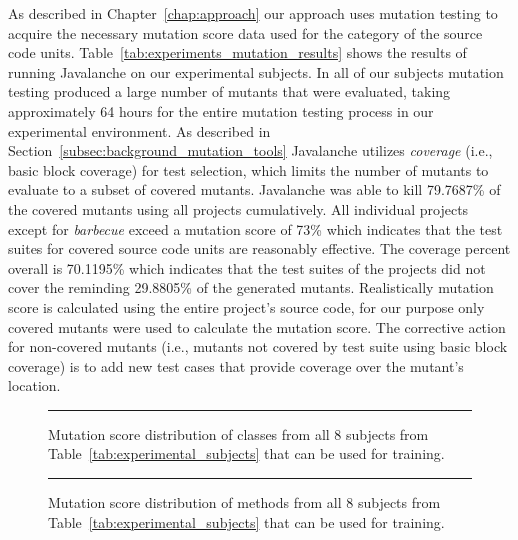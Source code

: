 \noindent
As described in Chapter~\ref{chap:approach} our approach uses mutation testing to acquire the necessary mutation score data used for the category of the source code units. Table~\ref{tab:experiments_mutation_results} shows the results of running Javalanche on our experimental subjects. In all of our subjects mutation testing produced a large number of mutants that were evaluated, taking approximately 64 hours for the entire mutation testing process in our experimental environment. As described in Section~\ref{subsec:background_mutation_tools} Javalanche utilizes \emph{coverage} (i.e., basic block coverage) for test selection, which limits the number of mutants to evaluate to a subset of covered mutants. Javalanche was able to kill 79.7687\% of the covered mutants using all projects cumulatively. All individual projects except for \emph{barbecue} exceed a mutation score of 73\% which indicates that the test suites for covered source code units are reasonably effective. The coverage percent overall is 70.1195\% which indicates that the test suites of the projects did not cover the reminding 29.8805\% of the generated mutants. Realistically mutation score is calculated using the entire project's source code, for our purpose only covered mutants were used to calculate the mutation score. The corrective action for non-covered mutants (i.e., mutants not covered by test suite using basic block coverage) is to add new test cases that provide coverage over the mutant's location.

\begin{figure}[!ht]
  \centering
  \caption{Mutation score distribution of classes from all 8 subjects from Table~\ref{tab:experimental_subjects} that can be used for training.}
  \vspace{2mm}
  \hrule
  \label{fig:mutation_distributions_class_all}
\end{figure}

\begin{figure}[!ht]
  \centering
  \caption{Mutation score distribution of methods from all 8 subjects from Table~\ref{tab:experimental_subjects} that can be used for training.}
  \vspace{2mm}
  \hrule
  \label{fig:mutation_distributions_method_all}
\end{figure}

